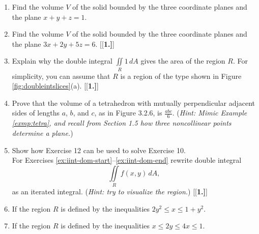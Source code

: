 \begin{enumerate}[\bfseries 1.]
 \item Find the volume $V$ of the solid bounded by the three coordinate planes and the plane $x+y+z=1$.
 \item Find the volume $V$ of the solid bounded by the three coordinate planes and the plane $3x+2y+5z=6$.
[{[\bfseries 1.]}]
 \item Explain why the double integral $\iint\limits_{R} 1\,dA$ gives the area of the region $R$. For simplicity,
  you can assume that $R$ is a region of the type shown in Figure \ref{fig:doubleintslices}(a).
[{[\bfseries 1.]}]
 \piccaption[]{}
 \item Prove that the volume of a tetrahedron with mutually perpendicular adjacent sides of lengths $a$, $b$, and $c$,
  as in Figure 3.2.6, is $\frac{abc}{6}$. (\emph{Hint: Mimic Example \ref{exmp:tetra}, and recall from Section 1.5 how
  three noncollinear points determine a plane.})
 \item Show how Exercise 12 can be used to solve Exercise 10.
\\
For Exercises \ref{ex:iint-dom-start}--\ref{ex:iint-dom-end} rewrite double integral 
 \[\iint\limits_{R} f(x,y)\,dA,\]
 as an iterated integral. (\emph{Hint: try to visualize the region.})
[{[\bfseries 1.]}]
\item\label{ex:iint-dom-start} If the region $R$ is defined by the inequalities $2y^2\le x\le 1+y^2$.
\item\label{ex:iint-dom-end} If the region $R$ is defined by the inequalities $x\le 2y\le 4x\le 1$.
\end{enumerate}
\newpage
